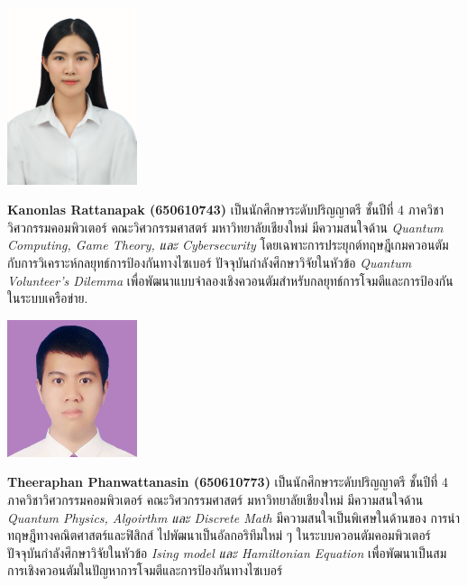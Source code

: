 \documentclass[semifinal]{cpecmu}
\author{นางสาวกนลลัส รัตนภาค}{Kanonlas Rattanapak}{650610743}
\author{นางสาวแก้วตา ลุงต๊ะ}{Kaewtar Lungta}{650610750}
\author{นายธีระพันธุ์ พันธุ์วรรธนะสิน}{Theeraphan Phanwattanasin}{650610773}
\begin{document}


\pagestyle{empty}\cleardoublepage
\normalspacing \setcounter{page}{1}  \pagestyle{cpecmu}





\ifproject

\fi



\ifproject
\normalspacing
\appendix


\ifglossary\glossarypage\fi

\ifindex\indexpage\fi

\begin{biosketch}
\begin{center}
  \includegraphics[width=1.5in]{0743.jpeg}
\end{center}
\textbf{Kanonlas Rattanapak (650610743)} เป็นนักศึกษาระดับปริญญาตรี ชั้นปีที่ 4 
ภาควิชาวิศวกรรมคอมพิวเตอร์ คณะวิศวกรรมศาสตร์ มหาวิทยาลัยเชียงใหม่
มีความสนใจด้าน \textit{Quantum Computing, Game Theory, และ Cybersecurity}
โดยเฉพาะการประยุกต์ทฤษฎีเกมควอนตัมกับการวิเคราะห์กลยุทธ์การป้องกันทางไซเบอร์
ปัจจุบันกำลังศึกษาวิจัยในหัวข้อ \textit{Quantum Volunteer's Dilemma}
เพื่อพัฒนาแบบจำลองเชิงควอนตัมสำหรับกลยุทธ์การโจมตีและการป้องกันในระบบเครือข่าย.

\begin{center}
  \includegraphics[width=1.5in]{0773.jpg}
\end{center}
\textbf{Theeraphan Phanwattanasin (650610773)} เป็นนักศึกษาระดับปริญญาตรี ชั้นปีที่ 4 
ภาควิชาวิศวกรรมคอมพิวเตอร์ คณะวิศวกรรมศาสตร์ มหาวิทยาลัยเชียงใหม่
มีความสนใจด้าน \textit{Quantum Physics, Algoirthm และ Discrete Math}
มีความสนใจเป็นพิเศษในด้านของ การนำทฤษฎีทางคณิตศาสตร์และฟิสิกส์ ไปพัฒนาเป็นอัลกอริทึมใหม่ ๆ ในระบบควอนตัมคอมพิวเตอร์ ปัจจุบันกำลังศึกษาวิจัยในหัวข้อ \textit{Ising model และ Hamiltonian Equation} เพื่อพัฒนาเป็นสมการเชิงควอนตัมในปัญหาการโจมตีและการป้องกันทางไซเบอร์



\end{biosketch}
\fi %
\end{document}
